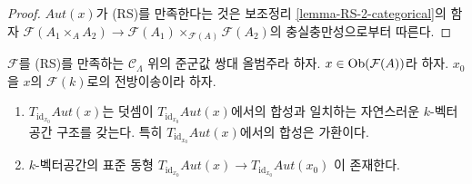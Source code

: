 \begin{proof}
$\mathit{Aut}(x)$가 (RS)를 만족한다는 것은 보조정리
\ref{lemma-RS-2-categorical}의 함자
$\mathcal{F}(A_1 \times_A A_2) \to
\mathcal{F}(A_1) \times_{\mathcal{F}(A)} \mathcal{F}(A_2)$의
충실충만성으로부터 따른다.
\end{proof}

\begin{lemma}
\label{lemma-Aut-functor-tangent-space}
$\mathcal{F}$를 (RS)를 만족하는 $\mathcal{C}_\Lambda$ 위의 준군값 쌍대
올범주라 하자. $x \in \mathop{\mathrm{Ob}}\nolimits(\mathcal{F}(A))$라 하자. $x_0$을
$x$의 $\mathcal{F}(k)$로의 전방이송이라 하자.
\begin{enumerate}
\item $T_{\text{id}_{x_0}} \mathit{Aut}(x)$는 덧셈이
$T_{\text{id}_{x_0}} \mathit{Aut}(x)$에서의 합성과 일치하는 자연스러운
$k$-벡터공간 구조를 갖는다. 특히
$T_{\text{id}_{x_0}} \mathit{Aut}(x)$에서의 합성은 가환이다.
\item $k$-벡터공간의 표준 동형
$T_{\text{id}_{x_0}} \mathit{Aut}(x) \to
T_{\text{id}_{x_0}} \mathit{Aut}(x_0)$
이 존재한다.
\end{enumerate}
\end{lemma}

